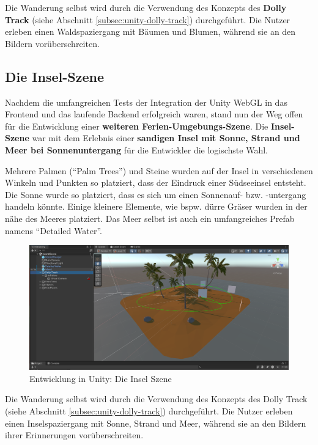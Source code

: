 Die Wanderung selbst wird durch die Verwendung des Konzepts des \textbf{Dolly Track} (siehe Abschnitt \ref{subsec:unity-dolly-track}) durchgeführt. Die Nutzer erleben einen Waldspaziergang mit Bäumen und Blumen, während sie an den Bildern vorüberschreiten.


\subsection{Die Insel-Szene}

Nachdem die umfangreichen Tests der Integration der Unity WebGL in das Frontend und das laufende Backend erfolgreich waren, stand nun der Weg offen für die Entwicklung einer \textbf{weiteren Ferien-Umgebungs-Szene}. Die \textbf{Insel-Szene} war mit dem Erlebnis einer \textbf{sandigen Insel mit Sonne, Strand und Meer bei Sonnenuntergang} für die Entwickler die logischste Wahl.   

Mehrere Palmen (``Palm Trees'') und Steine wurden auf der Insel in verschiedenen Winkeln und Punkten so platziert, dass der Eindruck einer Südseeinsel entsteht. Die Sonne wurde so platziert, dass es sich um einen Sonnenauf- bzw. -untergang handeln könnte. Einige kleinere Elemente, wie bspw. dürre Gräser wurden in der nähe des Meeres platziert. Das Meer selbst ist auch ein umfangreiches Prefab namens ``Detailed Water''. 



\begin{figure} [h t]
    \centering
    \includegraphics[scale=0.15]{pics/unity-edit-island.png}
    \caption{Entwicklung in Unity: Die Insel Szene}
    \label{fig:unity-edit-island}
\end{figure}


Die Wanderung selbst wird durch die Verwendung des Konzepts des Dolly Track (siehe Abschnitt \ref{subsec:unity-dolly-track}) durchgeführt. Die Nutzer erleben einen Inselspaziergang mit Sonne, Strand und Meer, während sie an den Bildern ihrer Erinnerungen vorüberschreiten.


